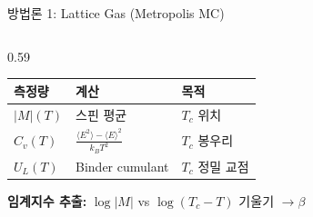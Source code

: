 \documentclass[aspectratio=169]{beamer}
\begin{document}
\begin{frame}{방법론 1: Lattice Gas (Metropolis MC)}
\begin{columns}[T]
\begin{column}{0.59\textwidth}
\vspace{0.3em}
\begin{tabular}{p{1.5cm}p{3.2cm}p{2.5cm}}
\toprule
측정량 & 계산 & 목적\\
\midrule
$|M|(T)$ & 스핀 평균 & $T_c$ 위치\\[0.2em]
$C_v(T)$ & $\frac{\langle E^2\rangle-\langle E\rangle^2}{k_BT^2}$ & $T_c$ 봉우리\\[0.4em]
$U_L(T)$ & Binder cumulant & $T_c$ 정밀 교점\\
\bottomrule
\end{tabular}

\vspace{0.35em}
{\small \textbf{임계지수 추출:}
$\log|M|$ vs $\log(T_c-T)$ 기울기 $\to \beta$}

\end{column}
\end{columns}

\end{frame}
\end{document}
